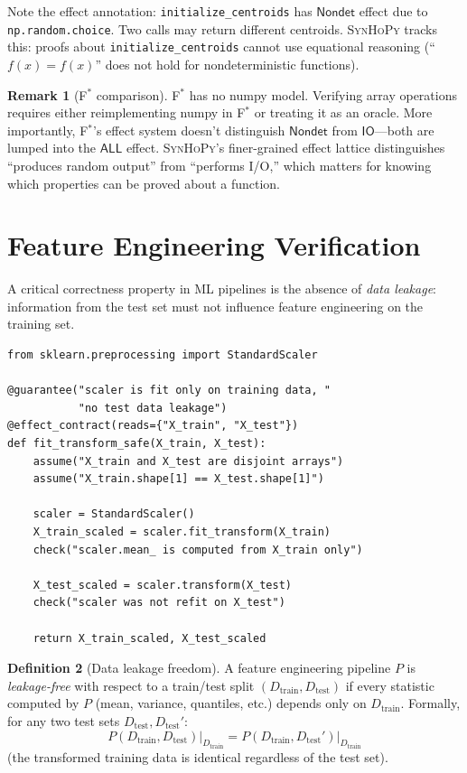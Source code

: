 \documentclass[11pt,a4paper]{report}
\theoremstyle{definition}
\newtheorem{definition}{Definition}[chapter]
\newtheorem{remark}[definition]{Remark}
\theoremstyle{plain}
\newcommand{\IO}{\mathsf{IO}}
\newcommand{\Nondet}{\mathsf{Nondet}}
\newcommand{\fstar}{F$^{*}$}
\newcommand{\synhopy}{\textsc{SynHoPy}}
\begin{document}
Note the effect annotation: \texttt{initialize\_centroids} has
$\Nondet$ effect due to \texttt{np.random.choice}.  Two calls
may return different centroids.  \synhopy{} tracks this: proofs about
\texttt{initialize\_centroids} cannot use equational reasoning
(``$f(x) = f(x)$'' does not hold for nondeterministic functions).

\begin{remark}[\fstar{} comparison]
\fstar{} has no numpy model.  Verifying array operations requires either
reimplementing numpy in \fstar{} or treating it as an oracle.
More importantly, \fstar{}'s effect system doesn't distinguish
$\Nondet$ from $\IO$---both are lumped into the $\mathsf{ALL}$ effect.
\synhopy{}'s finer-grained effect lattice distinguishes ``produces random output''
from ``performs I/O,'' which matters for knowing which properties
can be proved about a function.
\end{remark}

\section{Feature Engineering Verification}

A critical correctness property in ML pipelines is the absence of
\emph{data leakage}: information from the test set must not influence
feature engineering on the training set.

\begin{lstlisting}[style=synhopy]
from sklearn.preprocessing import StandardScaler

@guarantee("scaler is fit only on training data, "
           "no test data leakage")
@effect_contract(reads={"X_train", "X_test"})
def fit_transform_safe(X_train, X_test):
    assume("X_train and X_test are disjoint arrays")
    assume("X_train.shape[1] == X_test.shape[1]")

    scaler = StandardScaler()
    X_train_scaled = scaler.fit_transform(X_train)
    check("scaler.mean_ is computed from X_train only")

    X_test_scaled = scaler.transform(X_test)
    check("scaler was not refit on X_test")

    return X_train_scaled, X_test_scaled
\end{lstlisting}

\begin{definition}[Data leakage freedom]
A feature engineering pipeline $P$ is \emph{leakage-free} with respect
to a train/test split $(D_{\mathrm{train}}, D_{\mathrm{test}})$ if
every statistic computed by $P$ (mean, variance, quantiles, etc.)
depends only on $D_{\mathrm{train}}$.  Formally, for any two test sets
$D_{\mathrm{test}}, D_{\mathrm{test}}'$:
\[
  P(D_{\mathrm{train}}, D_{\mathrm{test}}) \big|_{D_{\mathrm{train}}}
  = P(D_{\mathrm{train}}, D_{\mathrm{test}}') \big|_{D_{\mathrm{train}}}
\]
(the transformed training data is identical regardless of the test set).
\end{definition}
\end{document}
